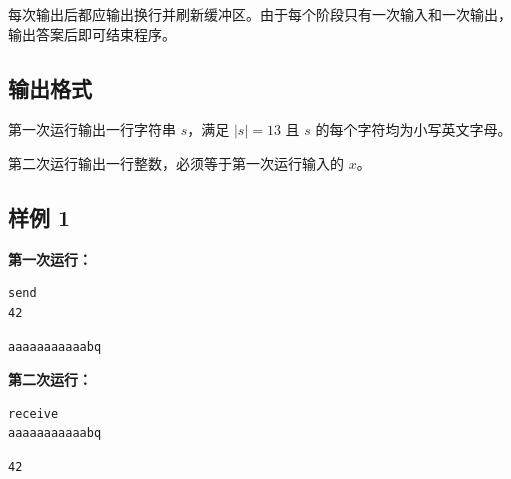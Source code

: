 每次输出后都应输出换行并刷新缓冲区。由于每个阶段只有一次输入和一次输出，输出答案后即可结束程序。

\subsection{输出格式}

第一次运行输出一行字符串 $s$，满足 $|s|=13$ 且 $s$ 的每个字符均为小写英文字母。

第二次运行输出一行整数，必须等于第一次运行输入的 $x$。

\subsection{样例 1}

\textbf{第一次运行：}

\begin{minipage}{\linewidth}
   \begin{minipage}[t]{0.49\linewidth}
      \begin{lstlisting}[title=\texttt{standard input}]
send
42
\end{lstlisting}
   \end{minipage}
   \begin{minipage}[t]{0.49\linewidth}
      \begin{lstlisting}[title=\texttt{standard output}]
aaaaaaaaaaabq
\end{lstlisting}
   \end{minipage}
\end{minipage}

\textbf{第二次运行：}

\begin{minipage}{\linewidth}
   \begin{minipage}[t]{0.49\linewidth}
      \begin{lstlisting}[title=\texttt{standard input}]
receive
aaaaaaaaaaabq
\end{lstlisting}
   \end{minipage}
   \begin{minipage}[t]{0.49\linewidth}
      \begin{lstlisting}[title=\texttt{standard output}]
42
\end{lstlisting}
   \end{minipage}
\end{minipage}


